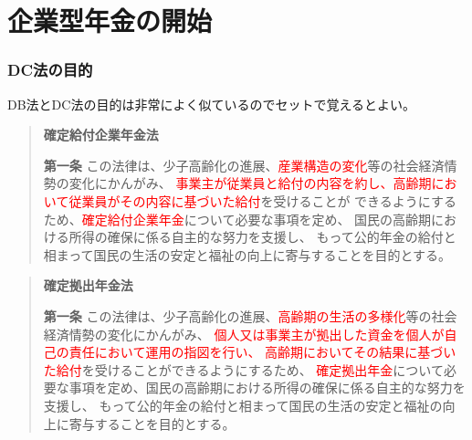 \section{企業型年金の開始}


\subsubsection{DC法の目的}

\begin{itembox}[l]{}
  DB法とDC法の目的は非常によく似ているのでセットで覚えるとよい。

  \begin{quote}
    \textbf{確定給付企業年金法}

    \textbf{第一条} \;\;
    この法律は、少子高齢化の進展、\textcolor{red}{産業構造の変化}等の社会経済情勢の変化にかんがみ、
    \textcolor{red}{事業主が従業員と給付の内容を約し、高齢期において従業員がその内容に基づいた給付}を受けることが
    できるようにするため、\textcolor{red}{確定給付企業年金}について必要な事項を定め、
    国民の高齢期における所得の確保に係る自主的な努力を支援し、
    もって公的年金の給付と相まって国民の生活の安定と福祉の向上に寄与することを目的とする。
  \end{quote}

  \begin{quote}
    \textbf{確定拠出年金法}

    \textbf{第一条} \;\;
    この法律は、少子高齢化の進展、\textcolor{red}{高齢期の生活の多様化}等の社会経済情勢の変化にかんがみ、
    \textcolor{red}{個人又は事業主が拠出した資金を個人が自己の責任において運用の指図を行い、
    高齢期においてその結果に基づいた給付}を受けることができるようにするため、
    \textcolor{red}{確定拠出年金}について必要な事項を定め、国民の高齢期における所得の確保に係る自主的な努力を支援し、
    もって公的年金の給付と相まって国民の生活の安定と福祉の向上に寄与することを目的とする。
  \end{quote}
\end{itembox}

